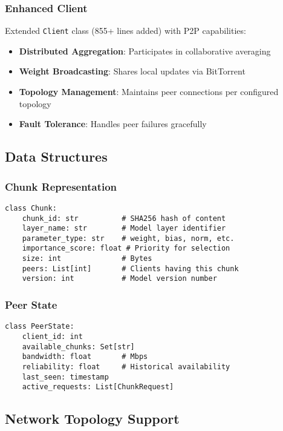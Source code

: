 \documentclass[11pt,conference]{article}
\begin{document}
\subsubsection{Enhanced Client}
Extended \texttt{Client} class (855+ lines added) with P2P capabilities:
\begin{itemize}
    \item \textbf{Distributed Aggregation}: Participates in collaborative averaging
    \item \textbf{Weight Broadcasting}: Shares local updates via BitTorrent
    \item \textbf{Topology Management}: Maintains peer connections per configured topology
    \item \textbf{Fault Tolerance}: Handles peer failures gracefully
\end{itemize}

\subsection{Data Structures}

\subsubsection{Chunk Representation}
\begin{verbatim}
class Chunk:
    chunk_id: str          # SHA256 hash of content
    layer_name: str        # Model layer identifier
    parameter_type: str    # weight, bias, norm, etc.
    importance_score: float # Priority for selection
    size: int              # Bytes
    peers: List[int]       # Clients having this chunk
    version: int           # Model version number
\end{verbatim}

\subsubsection{Peer State}
\begin{verbatim}
class PeerState:
    client_id: int
    available_chunks: Set[str]
    bandwidth: float       # Mbps
    reliability: float     # Historical availability
    last_seen: timestamp
    active_requests: List[ChunkRequest]
\end{verbatim}

\subsection{Network Topology Support}
\end{document}
